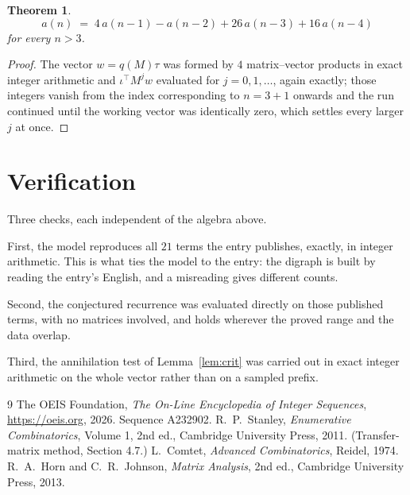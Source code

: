 \documentclass[11pt,a4paper]{article}
\theoremstyle{plain}
\newtheorem{theorem}{Theorem}
\theoremstyle{definition}
\begin{document}
\begin{theorem}
\[
a(n)\;=\;4\,a(n-1) - a(n-2) + 26\,a(n-3) + 16\,a(n-4)
\]
for every $n>3$.
\end{theorem}

\begin{proof}
The vector $w=q(M)\tau$ was formed by $4$ matrix--vector products in exact integer
arithmetic and $\iota^{\!\top}M^{j}w$ evaluated for $j=0,1,\dots$, again exactly; those
integers vanish from the index corresponding to $n=3+1$ onwards and the run continued
until the working vector was identically zero, which settles every larger $j$ at once.
\end{proof}

\section{Verification}

Three checks, each independent of the algebra above.

First, the model reproduces all $21$ terms the entry publishes, exactly, in integer
arithmetic. This is what ties the model to the entry: the digraph is built by reading the
entry's English, and a misreading gives different counts.

Second, the conjectured recurrence was evaluated directly on those published terms, with no
matrices involved, and holds wherever the proved range and the data overlap.

Third, the annihilation test of Lemma~\ref{lem:crit} was carried out in exact integer
arithmetic on the whole vector rather than on a sampled prefix.

\begin{thebibliography}{9}
 The OEIS Foundation, \emph{The On-Line Encyclopedia of Integer
Sequences}, \url{https://oeis.org}, 2026. Sequence A232902.
 R.~P.~Stanley, \emph{Enumerative Combinatorics}, Volume 1, 2nd ed.,
Cambridge University Press, 2011. (Transfer-matrix method, Section 4.7.)
 L.~Comtet, \emph{Advanced Combinatorics}, Reidel, 1974.
 R.~A.~Horn and C.~R.~Johnson, \emph{Matrix Analysis}, 2nd ed., Cambridge
University Press, 2013.
\end{thebibliography}
\end{document}
